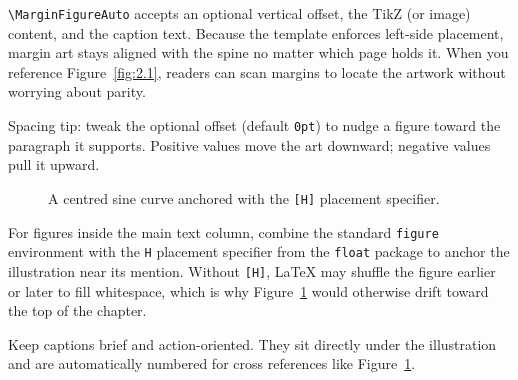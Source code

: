 \label{ch:figures}

\label{sec:margin-figures}


\verb|\MarginFigureAuto| accepts an optional vertical offset, the TikZ (or image)
content, and the caption text. Because the template enforces left-side placement,
margin art stays aligned with the spine no matter which page holds it. When you
reference Figure~\ref{fig:2.1}, readers can scan margins to locate the artwork
without worrying about parity.

Spacing tip: tweak the optional offset (default \verb|0pt|) to nudge a figure
toward the paragraph it supports. Positive values move the art downward; negative
values pull it upward.

\label{sec:body-floats}

\begin{figure}[H]
  \centering
  \caption{A centred sine curve anchored with the \texttt{[H]} placement specifier.}
  \label{fig:body-float}
\end{figure}

For figures inside the main text column, combine the standard \verb|figure|
environment with the \verb|H| placement specifier from the \texttt{float} package
to anchor the illustration near its mention. Without \verb|[H]|, LaTeX may shuffle
the figure earlier or later to fill whitespace, which is why
Figure~\ref{fig:body-float} would otherwise drift toward the top of the chapter.

Keep captions brief and action-oriented. They sit directly under the illustration
and are automatically numbered for cross references like Figure~\ref{fig:body-float}.

